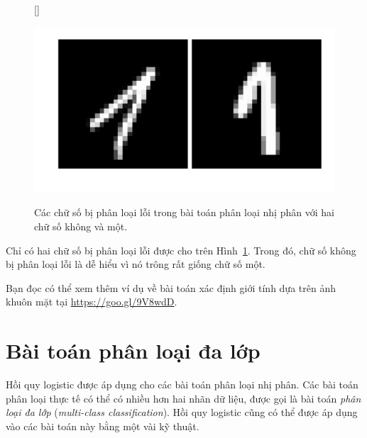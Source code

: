\begin{figure}[t]

[\FBwidth]
{\caption{
Các chữ số bị phân loại lỗi trong bài toán phân loại nhị phân với hai chữ số không và một.
}
\label{fig:10_mnist_miss}}
{ %
\includegraphics[width=.4\textwidth]{ebookML_src/src/logistic_regression/mnist_mis.pdf}
}
\end{figure}
Chỉ có hai chữ số bị phân loại lỗi được cho trên Hình~\ref{fig:10_mnist_miss}.
Trong đó, chữ số không bị phân loại lỗi là dễ hiểu vì nó trông rất giống chữ số một.



Bạn đọc có thể xem thêm ví dụ về bài toán xác định giới tính dựa trên ảnh
khuôn mặt tại \url{https://goo.gl/9V8wdD}.

\section{Bài toán phân loại đa lớp}
\label{sec:biclassifier}
Hồi quy logistic được áp dụng cho các bài toán phân loại nhị phân. Các bài
toán phân loại thực tế có thể có nhiều hơn hai nhãn dữ liệu, được gọi
là bài toán \textit{phân loại đa lớp} (\textit{multi-class classification}). Hồi quy logistic cũng có thể được áp dụng vào các bài toán này bằng một vài kỹ thuật.

